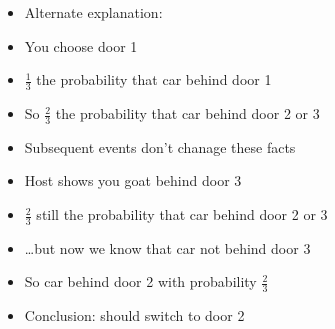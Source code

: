 \documentclass[handout]{beamer}
\theoremstyle{definition}
\begin{document}
\begin{frame}
\begin{itemize}
\item Alternate explanation:
\item You choose door 1
\item $\frac{1}{3}$ the probability that car behind door 1
\item So $\frac{2}{3}$ the probability that car behind
door 2 or 3
\item Subsequent events don't chanage these facts
\item Host shows you goat behind door 3
\item $\frac{2}{3}$ still the probability that car behind
door 2 or 3
\item \dots but now we know that car \alert{not} behind
door 3
\item So car behind door 2 with probability $\frac{2}{3}$
\item Conclusion: should switch to door 2
\end{itemize}
\end{frame}
\end{document}
